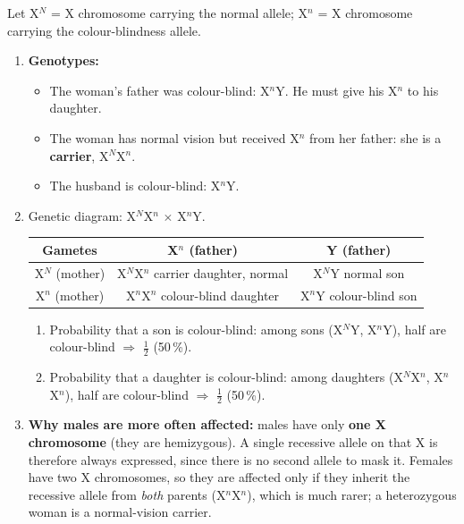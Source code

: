 \documentclass[11pt]{article}
\newcommand{\cle}[1]{{\popxbold\color{popdark}#1}}
\begin{document}
\begin{corrige}
Let X$^N$ = X chromosome carrying the normal allele; X$^n$ = X chromosome carrying the colour-blindness allele.
\begin{enumerate}
\item \textbf{Genotypes:}
\begin{itemize}
\item The woman's father was colour-blind: X$^n$Y. He must give his X$^n$ to his daughter.
\item The woman has normal vision but received X$^n$ from her father: she is a \textbf{carrier}, X$^N$X$^n$.
\item The husband is colour-blind: X$^n$Y.
\end{itemize}
\item Genetic diagram: X$^N$X$^n$ $\times$ X$^n$Y.

\begin{center}
\begin{tabular}{|c|c|c|}
\hline
\rowcolor{popblueL} Gametes & X$^n$ (father) & Y (father) \\
\hline
X$^N$ (mother) & X$^N$X$^n$ carrier daughter, normal & X$^N$Y normal son \\
\hline
X$^n$ (mother) & X$^n$X$^n$ colour-blind daughter & X$^n$Y colour-blind son \\
\hline
\end{tabular}
\end{center}

\begin{enumerate}
\item Probability that a son is colour-blind: among sons (X$^N$Y, X$^n$Y), half are colour-blind $\Rightarrow$ $\tfrac{1}{2}$ (50\,\%).
\item Probability that a daughter is colour-blind: among daughters (X$^N$X$^n$, X$^n$X$^n$), half are colour-blind $\Rightarrow$ $\tfrac{1}{2}$ (50\,\%).
\end{enumerate}
\item \textbf{Why males are more often affected:} males have only \textbf{one X chromosome} (they are \cle{hemizygous}). A single recessive allele on that X is therefore always expressed, since there is no second allele to mask it. Females have two X chromosomes, so they are affected only if they inherit the recessive allele from \emph{both} parents (X$^n$X$^n$), which is much rarer; a heterozygous woman is a normal-vision carrier.
\end{enumerate}
\end{corrige}
\end{document}
